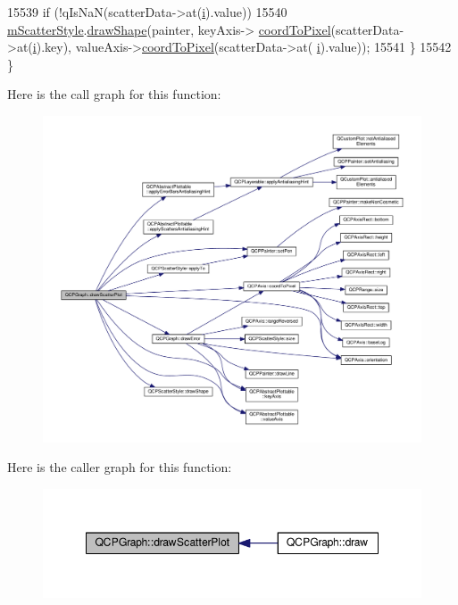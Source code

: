 \begin{DoxyCode}
15539       \textcolor{keywordflow}{if} (!qIsNaN(scatterData->at(\hyperlink{_comparision_pictures_2_createtest_image_8m_a6f6ccfcf58b31cb6412107d9d5281426}{i}).value))
15540         \hyperlink{class_q_c_p_graph_a4aa36241f166ccd1f75fc8f24e4a3247}{mScatterStyle}.\hyperlink{class_q_c_p_scatter_style_a992d531ac471ec2b29bdec6aeb400a06}{drawShape}(painter, keyAxis->
      \hyperlink{class_q_c_p_axis_a985ae693b842fb0422b4390fe36d299a}{coordToPixel}(scatterData->at(\hyperlink{_comparision_pictures_2_createtest_image_8m_a6f6ccfcf58b31cb6412107d9d5281426}{i}).key), valueAxis->\hyperlink{class_q_c_p_axis_a985ae693b842fb0422b4390fe36d299a}{coordToPixel}(scatterData->at(
      \hyperlink{_comparision_pictures_2_createtest_image_8m_a6f6ccfcf58b31cb6412107d9d5281426}{i}).value));
15541   \}
15542 \}
\end{DoxyCode}


Here is the call graph for this function\+:\nopagebreak
\begin{figure}[H]
\begin{center}
\leavevmode
\includegraphics[width=350pt]{class_q_c_p_graph_a6bdc385b122ce06134d4196373ae2250_cgraph}
\end{center}
\end{figure}




Here is the caller graph for this function\+:\nopagebreak
\begin{figure}[H]
\begin{center}
\leavevmode
\includegraphics[width=348pt]{class_q_c_p_graph_a6bdc385b122ce06134d4196373ae2250_icgraph}
\end{center}
\end{figure}


